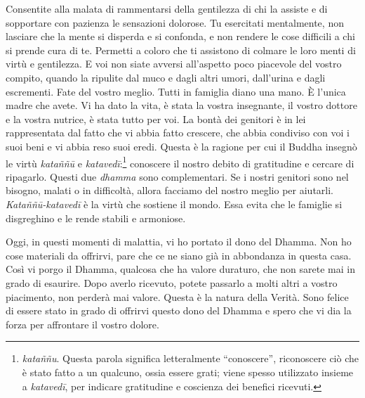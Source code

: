 Consentite alla malata di rammentarsi della gentilezza di chi la assiste
e di sopportare con pazienza le sensazioni dolorose. Tu esercitati
mentalmente, non lasciare che la mente si disperda e si confonda, e non
rendere le cose difficili a chi si prende cura di te. Permetti a coloro
che ti assistono di colmare le loro menti di virtù e gentilezza. E voi
non siate avversi all'aspetto poco piacevole del vostro compito, quando
la ripulite dal muco e dagli altri umori, dall'urina e dagli escrementi.
Fate del vostro meglio. Tutti in famiglia diano una mano. È l'unica
madre che avete. Vi ha dato la vita, è stata la vostra insegnante, il
vostro dottore e la vostra nutrice, è stata tutto per voi. La bontà dei
genitori è in lei rappresentata dal fatto che vi abbia fatto crescere,
che abbia condiviso con voi i suoi beni e vi abbia reso suoi eredi.
Questa è la ragione per cui il Buddha insegnò le virtù \emph{kataññū} e
\emph{katavedī}:\footnote{\emph{kataññu}. Questa parola significa
  letteralmente ``conoscere'', riconoscere ciò che è stato fatto a un
  qualcuno, ossia essere grati; viene spesso utilizzato insieme a
  \emph{katavedī}, per indicare gratitudine e coscienza dei benefici
  ricevuti.} conoscere il nostro debito di gratitudine e cercare di
ripagarlo. Questi due \emph{dhamma} sono complementari. Se i nostri
genitori sono nel bisogno, malati o in difficoltà, allora facciamo del
nostro meglio per aiutarli. \emph{Kataññū-katavedī} è la virtù che
sostiene il mondo. Essa evita che le famiglie si disgreghino e le rende
stabili e armoniose.

Oggi, in questi momenti di malattia, vi ho portato il dono del Dhamma.
Non ho cose materiali da offrirvi, pare che ce ne siano già in
abbondanza in questa casa. Così vi porgo il Dhamma, qualcosa che ha
valore duraturo, che non sarete mai in grado di esaurire. Dopo averlo
ricevuto, potete passarlo a molti altri a vostro piacimento, non perderà
mai valore. Questa è la natura della Verità. Sono felice di essere stato
in grado di offrirvi questo dono del Dhamma e spero che vi dia la forza
per affrontare il vostro dolore.


